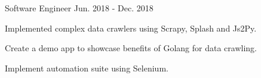 \begin{cventries}
  \cventry
    {Software Engineer} %
    {} %
    {} %
    {Jun. 2018 - Dec. 2018} %
    {
      \begin{cvitems} %
        \item {Implemented complex data crawlers using Scrapy, Splash and Js2Py.}
        \item {Create a demo app to showcase benefits of Golang for data crawling.}
        \item {Implement automation suite using Selenium.}
      \end{cvitems}
    }

\end{cventries}
